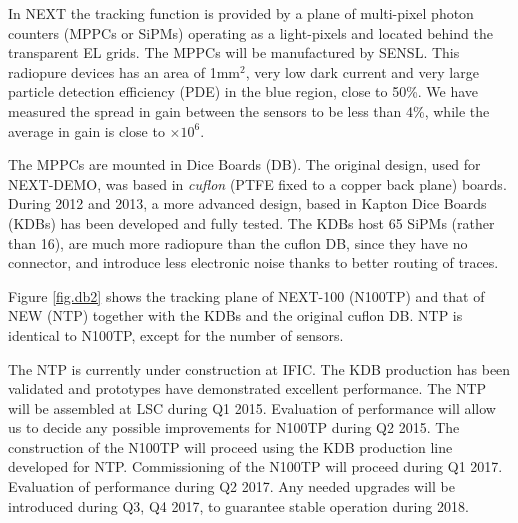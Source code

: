 \begin{enumerate}
In NEXT the tracking function is provided by a plane of multi-pixel photon counters (MPPCs or SiPMs) operating as a light-pixels and located behind the transparent EL grids. The MPPCs will be manufactured by SENSL. This radiopure devices has an area of 1mm$^2$, very low dark current and very large 
particle detection efficiency (PDE) in the blue region, close to 50\%. We have measured the spread in gain between the sensors to be less than 4\%, while the average in gain is close to $\times10^6$. 

The MPPCs are mounted in Dice Boards (DB). The original design, used for NEXT-DEMO, was based in   {\em cuflon} (PTFE fixed to a copper back plane) boards. During 2012 and 2013, a more advanced design, based in Kapton Dice Boards (KDBs) has been developed and fully tested. The KDBs host 65 SiPMs (rather than 16), are much more radiopure than the  cuflon DB, since they have no connector, and introduce less electronic noise thanks to better routing of traces. 

Figure \ref{fig.db2} shows the tracking plane of NEXT-100 (N100TP) and that of NEW (NTP) together with the KDBs and the original cuflon DB. 
NTP is identical to N100TP, except for the number of sensors. 

The NTP is currently under construction at IFIC. The KDB production has been validated and prototypes have demonstrated excellent performance. The NTP will be assembled at LSC during Q1 2015. Evaluation of performance will allow us to decide any possible improvements for N100TP during Q2 2015. The construction of the N100TP will proceed using the KDB production line developed for NTP. Commissioning of the N100TP will proceed during Q1 2017. Evaluation of performance during Q2 2017. Any needed upgrades will be introduced during Q3, Q4 2017, to guarantee stable operation during 2018. 




\end{enumerate}
%
%
